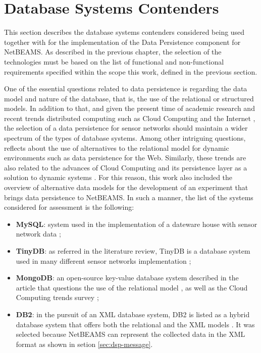 \section{Database Systems Contenders}

This section describes the database systems contenders considered being used
together with for the implementation of the Data Persistence component for 
NetBEAMS. As described in the previous chapter, the selection of the
technologies must be based on the list of functional and non-functional
requirements specified within the scope this work, defined in the previous
section.

One of the essential questions related to data persistence is regarding the
data model and nature of the database, that is, the use of the relational or
structured models. In addition to that, and given the present time of academic
research and recent trends distributed computing such as Cloud Computing and
the Internet \cite{cloud-comp-survey}, the selection of a data persistence for
sensor networks should maintain a wider spectrum of the types of database 
systems. Among other intriguing questions, \cite{db-is-rdbs-dommed} reflects
about the use of alternatives to the relational model for dynamic environments
such as data persistence for the Web. Similarly, these trends are also related
to the advances of Cloud Computing and its persistence layer as a solution to
dynamic systems \cite{cloud-comp-architectures}. For this reason, this work
also included the overview of alternative data models for the development of
an experiment that brings data persistence to NetBEAMS. In such a manner, the
list of the systems considered for assessment is the following:

\begin{itemize}
  \item \textbf{MySQL}\cite{mysql}: system used in the implementation of a
  dateware house with sensor network data \cite{sn-dataware-house};
  \item \textbf{TinyDB}\cite{tinydb}: as referred in the literature review,
  TinyDB is a database system used in many different sensor networks
  implementation \cite{sn-db-tinydb};
  \item \textbf{MongoDB}\cite{mongodb}: an open-source key-value database
  system described in the article that questions the use of the relational
  model \cite{db-is-rdbs-dommed}, as well as the Cloud Computing trends survey
  \cite{cloud-comp-architectures};
  \item \textbf{DB2}\cite{db2}: in the pursuit of an XML database system, DB2
  is listed as a hybrid database system that offers both the relational and the
  XML models \cite{db-xml-enabled}. It was selected because NetBEAMS can
  represent the collected data in the XML format as shown in setion 
  \ref{sec:dsp-message}.
\end{itemize}

